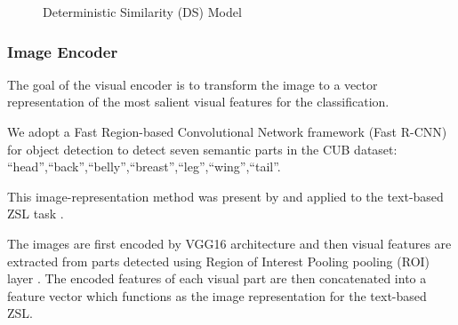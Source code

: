 \documentclass[11pt,a4paper]{article}
\newcommand\gal[1]{\textcolor{bright}{\textbf{GAL:} #1 }}
\begin{document}





\begin{figure}[t]
\centering
{}
 \caption{Deterministic Similarity (DS) Model}
\label{fig:DS}
\end{figure}

\subsubsection{Image Encoder}
\label{section:Image_Encoder}
The goal of the visual encoder is to transform the image to a vector representation of the most salient visual features for the classification.\par

We adopt a 
Fast Region-based Convolutional Network framework (Fast R-CNN) for object detection   \citep{girshick2015fast} to detect seven semantic parts in the CUB dataset:
\enquote{head},\enquote{back},\enquote{belly},\enquote{breast},\enquote{leg},\enquote{wing},\enquote{tail}.\par
This image-representation method was present by \citet{zhang2016spda} and applied to the text-based ZSL task \cite{zhu2018generative,elhoseiny2017link} . \par

The images are first encoded by VGG16 architecture \citep{simonyan2014very} and then visual features are extracted from parts detected using Region of Interest Pooling pooling (ROI) layer \citep{girshick2015fast}. %
The encoded features of each visual part are then concatenated into a feature vector which functions as the image representation for the text-based ZSL.
\end{document}
